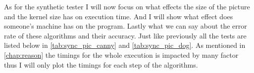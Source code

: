 As for the synthetic tester I will now focus on what effects the size of the picture and the kernel size has on execution time. And I will show what effect does someone's machine has on the program. Lastly what we can say about the error rate of these algorithms and their accuracy. Just like previously all the tests are listed below in \autoref{tab:sync_pic_canny} and \autoref{tab:sync_pic_dog}. As mentioned in \autoref{chap:reason} the timings for the whole execution is impacted by many factor thus I will only plot the timings for each step of the algorithms.

\begin{table}[H]
\centering
{}
\caption{Test plans for the  Synthetic tester for \ac{Canny} algorithm}
\label{tab:sync_pic_canny}
\end{table}

\begin{table}[H]
\centering
{}
\caption{Test plans for the  Synthetic tester for \ac{DoG} algorithm}
\label{tab:sync_pic_dog}
\end{table}


